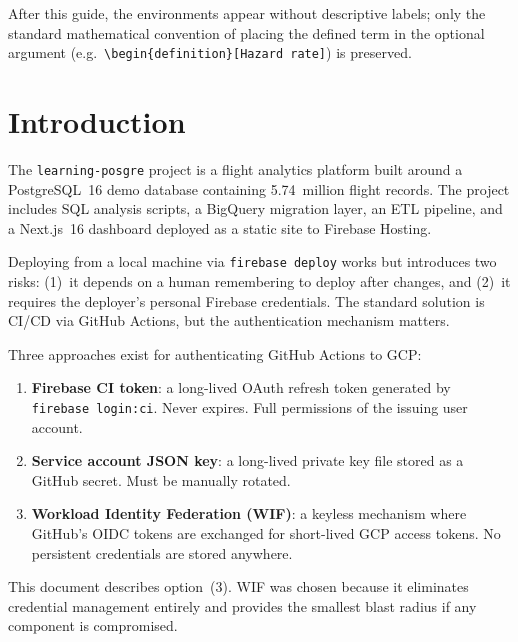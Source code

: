\documentclass[11pt,a4paper]{article}
\theoremstyle{plainref}
\begin{document}
\noindent After this guide, the environments appear without descriptive labels;
only the standard mathematical convention of placing the defined term in the
optional argument (e.g.\ \texttt{\textbackslash begin\{definition\}[Hazard rate]})
is preserved.

\vspace{6pt}

\section{Introduction}

The \texttt{learning-posgre} project is a flight analytics platform built around
a PostgreSQL~16 demo database containing 5.74~million flight records. The project
includes SQL analysis scripts, a BigQuery migration layer, an ETL pipeline, and a
Next.js~16 dashboard deployed as a static site to Firebase Hosting.

Deploying from a local machine via \texttt{firebase deploy} works but introduces
two risks: (1)~it depends on a human remembering to deploy after changes, and
(2)~it requires the deployer's personal Firebase credentials. The standard
solution is CI/CD via GitHub Actions, but the authentication mechanism matters.

Three approaches exist for authenticating GitHub Actions to GCP:

\begin{enumerate}[label=(\arabic*)]
  \item \textbf{Firebase CI token}: a long-lived OAuth refresh token generated by
        \texttt{firebase login:ci}. Never expires. Full permissions of the issuing
        user account.
  \item \textbf{Service account JSON key}: a long-lived private key file stored as
        a GitHub secret. Must be manually rotated.
  \item \textbf{Workload Identity Federation (WIF)}: a keyless mechanism where
        GitHub's OIDC tokens are exchanged for short-lived GCP access tokens.
        No persistent credentials are stored anywhere.
\end{enumerate}

This document describes option~(3). WIF was chosen because it eliminates
credential management entirely and provides the smallest blast radius if any
component is compromised.

\end{document}
